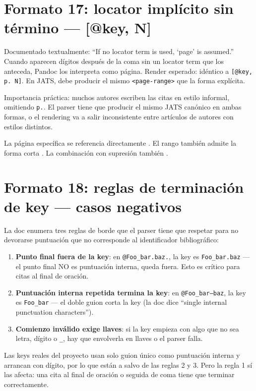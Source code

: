 \documentclass{article}
\begin{document}
\section{Formato 17: locator implícito sin término — [@key, N]}
Documentado textualmente: “If no locator term is used, ‘page’ is assumed.” Cuando aparecen dígitos después de la coma sin un locator term que los anteceda, Pandoc los interpreta como página. Render esperado: idéntico a \texttt{[@key, p. N]}. En JATS, debe producir el mismo \texttt{<page-range>} que la forma explícita.

Importancia práctica: muchos autores escriben las citas en estilo informal, omitiendo \texttt{p.}. El parser tiene que producir el mismo JATS canónico en ambas formas, o el rendering va a salir inconsistente entre artículos de autores con estilos distintos.

La página específica se referencia directamente \autocite[p. 33]{2961-KACZAN2016}. El rango también admite la forma corta \autocite[pp. 55-60]{3041-PINEAU1999}. La combinación con supresión también \autocite*[p. 235]{3036-ORBUCH2020}.


\section{Formato 18: reglas de terminación de key — casos negativos}
La doc enumera tres reglas de borde que el parser tiene que respetar para no devorarse puntuación que no corresponde al identificador bibliográfico:

\begin{enumerate}
  \item \textbf{Punto final fuera de la key}: en \texttt{@Foo\_bar.baz.}, la key es \texttt{Foo\_bar.baz} — el punto final NO es puntuación interna, queda fuera. Esto es crítico para citas al final de oración.
  \item \textbf{Puntuación interna repetida termina la key}: en \texttt{@Foo\_bar--baz}, la key es \texttt{Foo\_bar} — el doble guion corta la key (la doc dice “single internal punctuation characters”).
  \item \textbf{Comienzo inválido exige llaves}: si la key empieza con algo que no sea letra, dígito o \texttt{\_}, hay que envolverla en llaves o el parser falla.
\end{enumerate}

Las keys reales del proyecto usan solo guion único como puntuación interna y arrancan con dígito, por lo que están a salvo de las reglas 2 y 3. Pero la regla 1 sí las afecta: una cita al final de oración o seguida de coma tiene que terminar correctamente.
\end{document}
